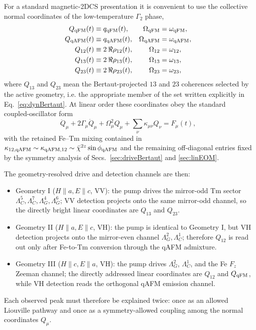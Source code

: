 \documentclass[reprint,amsmath,amssymb,aps,prb,longbibliography]{revtex4-2}
\begin{document}
For a standard magnetic-2DCS presentation it is convenient to use the
collective normal coordinates of the low-temperature $\Gamma_2$ phase,
\begin{equation}
\begin{aligned}
Q_{\rm qFM}(t)&\equiv q_{\rm qFM}(t), & \Omega_{\rm qFM}&=\omega_{\rm qFM},\\
Q_{\rm qAFM}(t)&\equiv q_{\rm qAFM}(t), & \Omega_{\rm qAFM}&=\omega_{\rm qAFM},\\
Q_{12}(t)&\equiv 2\,\Re\rho_{12}(t), & \Omega_{12}&=\omega_{12},\\
Q_{13}(t)&\equiv 2\,\Re\rho_{13}(t), & \Omega_{13}&=\omega_{13},\\
Q_{23}(t)&\equiv 2\,\Re\rho_{23}(t), & \Omega_{23}&=\omega_{23},
\end{aligned}
\label{eq:Qcoords}
\end{equation}
where $Q_{13}$ and $Q_{23}$ mean the Bertaut-projected $13$ and $23$
coherences selected by the active geometry, i.e. the appropriate member
of the set written explicitly in Eq.~\eqref{eq:dynBertaut}. At linear
order these coordinates obey the standard coupled-oscillator form
\begin{equation}
\ddot Q_\mu + 2\Gamma_\mu \dot Q_\mu + \Omega_\mu^2 Q_\mu
+ \sum_\nu \kappa_{\mu\nu} Q_\nu = F_\mu(t),
\label{eq:Qlinear}
\end{equation}
with the retained Fe--Tm mixing contained in
$\kappa_{12,{\rm qAFM}}\sim\kappa_{{\rm qAFM},12}\sim
\bar\chi^{2z}\sin\phi_{\rm qAFM}$ and the remaining off-diagonal
entries fixed by the symmetry analysis of Secs.~\ref{sec:driveBertaut}
and \ref{sec:linEOM}.

The geometry-resolved drive and detection channels are then:
\begin{itemize}[leftmargin=*]
\item Geometry I ($H\parallel a, E\parallel c$, VV): the pump drives the
mirror-odd Tm sector $\Lambda_C^5,\Lambda_C^7,\Lambda_G^4,\Lambda_G^6$;
VV detection projects onto the same mirror-odd channel, so the directly
bright linear coordinates are $Q_{13}$ and $Q_{23}$.
\item Geometry II ($H\parallel a, E\parallel c$, VH): the pump is
identical to Geometry I, but VH detection projects onto the mirror-even
channel $\Lambda_G^2,\Lambda_C^1$; therefore $Q_{12}$ is read out only
after Fe-to-Tm conversion through the qAFM admixture.
\item Geometry III ($H\parallel c, E\parallel a$, VH): the pump drives
$\Lambda_G^2$, $\Lambda_C^1$, and the Fe $F_z$ Zeeman channel; the
directly addressed linear coordinates are $Q_{12}$ and $Q_{\rm qFM}$,
while VH detection reads the orthogonal qAFM emission channel.
\end{itemize}
Each observed peak must therefore be explained twice: once as an allowed
Liouville pathway and once as a symmetry-allowed coupling among the
normal coordinates $Q_\mu$.
\end{document}
